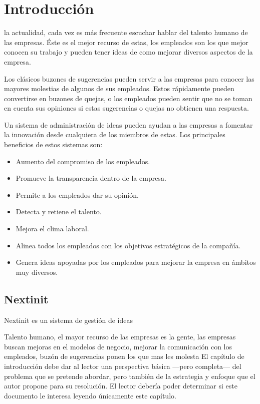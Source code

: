 \chapter{Introducción}

 la actualidad, cada vez es más frecuente escuchar hablar del talento humano de las empresas. Éste es el mejor recurso de estas,
 los empleados son los que mejor conocen su trabajo y pueden tener ideas de como mejorar diversos aspectos de la empresa. 
 
 Los clásicos buzones de sugerencias pueden servir a las empresas para conocer las mayores molestias de algunos de sus empleados. Estos 
 rápidamente pueden convertirse en buzones de quejas, o los empleados pueden sentir que no se toman en cuenta sus opiniones si estas 
 sugerencias o quejas no obtienen una respuesta.
 
 Un sistema de administración de ideas pueden ayudan a las empresas a fomentar la innovación desde cualquiera de los miembros de estas. Los 
 principales beneficios de estos sistemas son:
 
 \begin{itemize}
 	\item Aumento del compromiso de los empleados.
 	\item Promueve la transparencia dentro de la empresa.
 	\item Permite a los empleados dar su opinión.
 	\item Detecta y retiene el talento.
 	\item Mejora el clima laboral.
 	\item Alinea todos los empleados con los objetivos estratégicos de la compañía.
 	\item Genera ideas apoyadas por los empleados para mejorar la empresa en ámbitos muy diversos.
 \end{itemize}
 
 
 \section{Nextinit}
 
 Nextinit es un sistema de gestión de ideas


Talento humano, el mayor recurso de las empresas es la gente, 
las empresas buscan mejoras en el modelos de negocio, mejorar la comunicación con los empleados, buzón de sugerencias ponen los que mas les molesta
El capítulo de introducción debe dar al lector una perspectiva básica ---pero
completa--- del problema que se pretende abordar, pero también de la estrategia
y enfoque que el autor propone para su resolución. El lector debería poder
determinar si este documento le interesa leyendo únicamente este capítulo.


